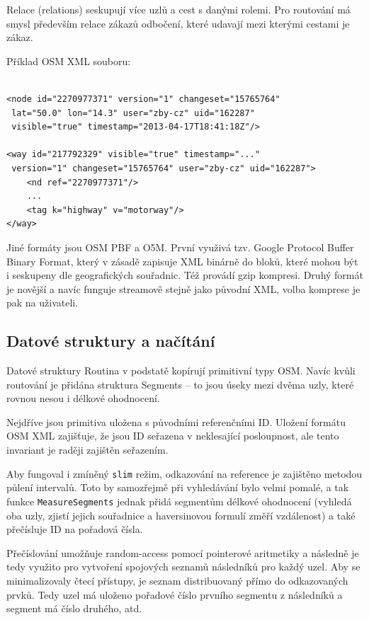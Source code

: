 \documentclass[thesis=B,czech]{FITthesis}[2012/06/26]
\begin{document}
 Relace (relations) seskupují více uzlů a cest s danými rolemi. Pro routování má smysl především relace zákazů odbočení, které udavají mezi kterými cestami je zákaz.
 

{Příklad OSM XML souboru:}
\begin{verbatim}

<node id="2270977371" version="1" changeset="15765764" 
 lat="50.0" lon="14.3" user="zby-cz" uid="162287" 
 visible="true" timestamp="2013-04-17T18:41:18Z"/>

<way id="217792329" visible="true" timestamp="..." 
 version="1" changeset="15765764" user="zby-cz" uid="162287">
    <nd ref="2270977371"/>
    ...
    <tag k="highway" v="motorway"/>
</way>
\end{verbatim}


Jiné formáty jsou OSM PBF a O5M. První využivá tzv. Google Protocol Buffer Binary Format, který v zásadě zapisuje XML binárně do bloků, které mohou být i seskupeny dle geografických souřadnic. Též provádí gzip kompresi. Druhý formát je novější a navíc funguje streamově stejně jako původní XML, volba komprese je pak na uživateli.



\subsection{Datové struktury a načítání}
Datové struktury Routina v podstatě kopírují primitivní typy OSM. Navíc kvůli routování je přidána struktura Segments -- to jsou úseky mezi dvěma uzly, které rovnou nesou i délkové ohodnocení. 

Nejdříve jsou primitiva uložena s původními referenčními ID. Uložení formátu OSM XML zajišťuje, že jsou ID seřazena v neklesající posloupnost, ale tento invariant je raději zajištěn seřazením. 

Aby fungoval i zmíněný \verb|slim| režim, odkazování na reference je zajištěno metodou půlení intervalů. Toto by samozřejmě při vyhledávání bylo velmi pomalé, a tak funkce \verb|MeasureSegments| jednak přidá segmentům délkové ohodnocení (vyhledá oba uzly, zjistí jejich souřadnice a haversinovou formulí změří vzdálenost) a také přečísluje ID na pořadová čísla.

Přečíslování umožňuje random-access pomocí pointerové aritmetiky a následně je tedy využito pro vytvoření spojových seznamů následníků pro každý uzel. Aby se minimalizovaly čtecí přístupy, je seznam distribuovaný přímo do odkazovaných prvků. Tedy uzel má uloženo pořadové číslo prvního segmentu z následníků a segment má číslo druhého, atd.
\end{document}
